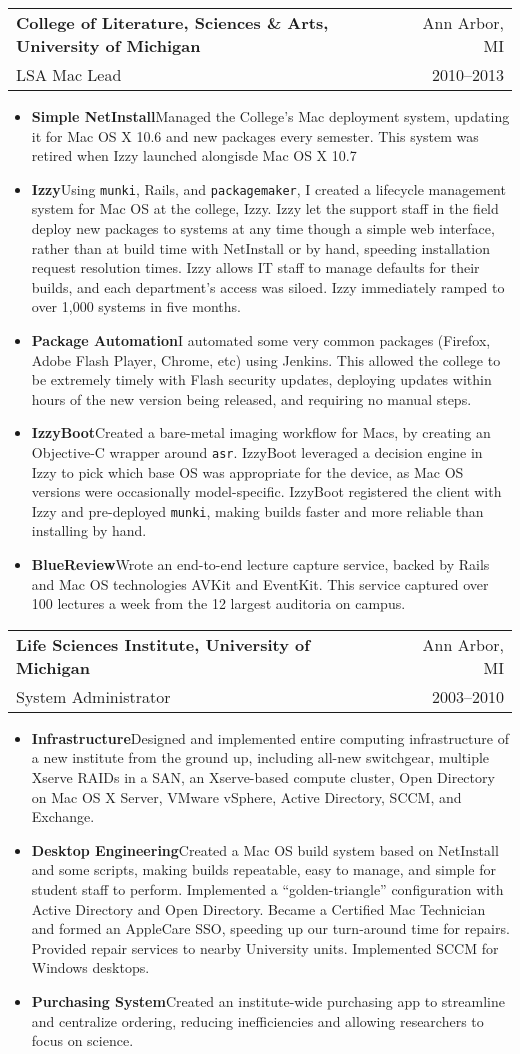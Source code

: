 \documentclass[letterpaper,10pt]{article}
\makeatletter
\newcommand{\munki}{\texttt{munki}}
\newcommand{\resumeItem}[2]{
  \item\small{
    \textbf{#1}{\hspace{0.6em}#2}
  }
}
\newcommand{\resumeSubheading}[4]{
  \item
    \begin{tabular*}{0.97\textwidth}[t]{l@{\extracolsep{\fill}}r}
      \textbf{#1} & #2 \\
      {\small #3} & {\small #4} \\
    \end{tabular*}\vspace{-6pt}
}
\newcommand{\resumeItemListStart}{\begin{itemize}}
\newcommand{\resumeItemListEnd}{\end{itemize}}
\makeatother
\begin{document}
    \resumeSubheading
      {College of Literature, Sciences \& Arts, University of Michigan}{Ann Arbor, MI}
      {LSA Mac Lead}{2010--2013}
      \resumeItemListStart
        \resumeItem{Simple NetInstall}
          {Managed the College's Mac deployment system, updating it for Mac OS X 10.6 and new packages every semester. This system was retired when Izzy launched alongisde Mac OS X 10.7}
        \resumeItem{Izzy}
          {Using \munki, Rails, and \texttt{packagemaker}, I created a lifecycle management system for Mac OS at the college, Izzy. Izzy let the support staff in the field deploy new packages to systems at any time though a simple web interface, rather than at build time with NetInstall or by hand, speeding installation request resolution times. Izzy  allows IT staff to manage defaults for their builds, and each department's access was siloed. Izzy immediately ramped to over 1,000 systems in five months.}
        \resumeItem{Package Automation}
          {I automated some very common packages (Firefox, Adobe Flash Player, Chrome, etc) using Jenkins. This allowed the college to be extremely timely with Flash security updates, deploying updates within hours of the new version being released, and requiring no manual steps.}
        \resumeItem{IzzyBoot}
          {Created a bare-metal imaging workflow for Macs, by creating an Objective-C wrapper around \texttt{asr}. IzzyBoot leveraged a decision engine in Izzy to pick which base OS was appropriate for the device, as Mac OS versions were occasionally model-specific. IzzyBoot registered the client with Izzy and pre-deployed \munki, making builds faster and more reliable than installing by hand.}
        \resumeItem{BlueReview}
          {Wrote an end-to-end lecture capture service, backed by Rails and Mac OS technologies AVKit and EventKit. This service captured over 100 lectures a week from the 12 largest auditoria on campus.}
      \resumeItemListEnd

    \resumeSubheading
      {Life Sciences Institute, University of Michigan}{Ann Arbor, MI}
      {System Administrator}{2003--2010}
      \resumeItemListStart
        \resumeItem{Infrastructure}
          {Designed and implemented entire computing infrastructure of a new institute from the ground up, including all-new switchgear, multiple Xserve RAIDs in a SAN, an Xserve-based compute cluster, Open Directory on Mac OS X Server, VMware vSphere, Active Directory, SCCM, and Exchange.}
        \resumeItem{Desktop Engineering}
          {Created a Mac OS build system based on NetInstall and some scripts, making builds repeatable, easy to manage, and simple for student staff to perform. Implemented a ``golden-triangle'' configuration with Active Directory and Open Directory. Became a Certified Mac Technician and formed an AppleCare SSO, speeding up our turn-around time for repairs. Provided repair services to nearby University units. Implemented SCCM for Windows desktops.}
        \resumeItem{Purchasing System}
          {Created an institute-wide purchasing app to streamline and centralize ordering, reducing inefficiencies and allowing researchers to focus on science.}
      \resumeItemListEnd
\end{document}

